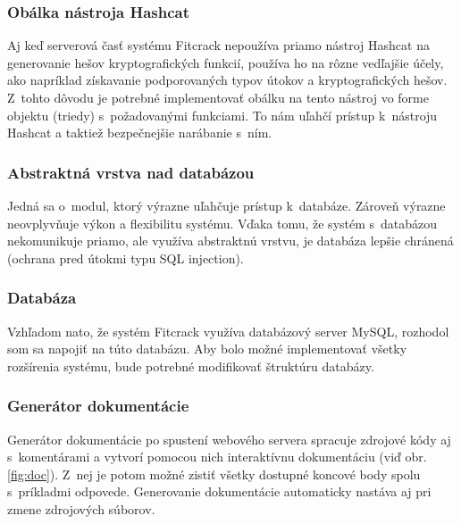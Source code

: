\documentclass[../projekt.tex]{subfiles}
\begin{document}
\subsubsection{Obálka nástroja Hashcat}
Aj keď serverová časť systému Fitcrack nepoužíva priamo nástroj Hashcat na generovanie hešov kryptografických funkcií, používa ho na rôzne vedľajšie účely, ako napríklad získavanie podporovaných typov útokov a kryptografických hešov. Z~tohto dôvodu je potrebné implementovať obálku na tento nástroj vo forme objektu (triedy) s~požadovanými funkciami. To nám uľahčí prístup k~nástroju Hashcat a taktiež bezpečnejšie narábanie s~ním.

\subsubsection{Abstraktná vrstva nad databázou}
Jedná sa o~modul, ktorý výrazne uľahčuje prístup k~databáze. Zároveň výrazne neovplyvňuje výkon a flexibilitu systému. Vďaka tomu, že systém s~databázou nekomunikuje priamo, ale využíva abstraktnú vrstvu, je databáza lepšie chránená (ochrana pred útokmi typu SQL injection).


\subsubsection{Databáza}
Vzhľadom nato, že systém Fitcrack využíva databázový server MySQL, rozhodol som sa napojiť na túto databázu. Aby bolo možné implementovať všetky rozšírenia systému, bude potrebné modifikovať štruktúru databázy.


\subsubsection{Generátor dokumentácie}
Generátor dokumentácie po spustení webového servera spracuje zdrojové kódy aj s~komentárami a vytvorí pomocou nich interaktívnu dokumentáciu (viď obr. \ref{fig:doc}). Z~nej je potom možné zistiť všetky dostupné koncové body spolu s~príkladmi odpovede. Generovanie dokumentácie automaticky nastáva aj pri zmene zdrojových súborov.
\end{document}
